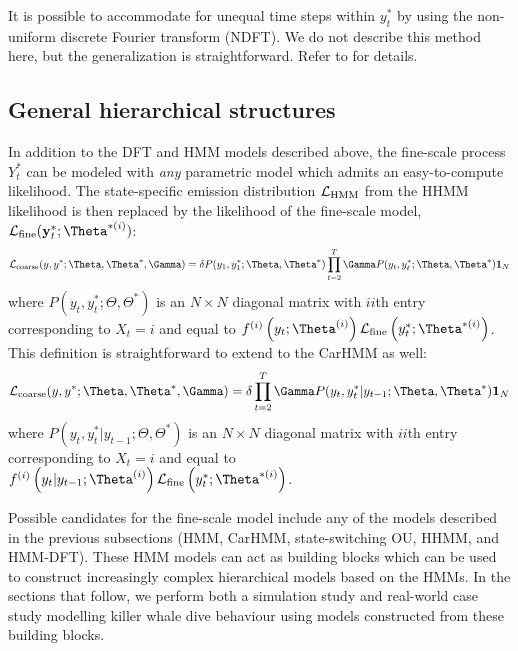 It is possible to accommodate for unequal time steps within $y_t^*$ by using the non-uniform discrete Fourier transform (NDFT). We do not describe this method here, but the generalization is straightforward. Refer to \citep{Bagchi:1999} for details.

\subsection{General hierarchical structures}

In addition to the DFT and HMM models described above, the fine-scale process $Y^*_t$ can be modeled with \textit{any} parametric model which admits an easy-to-compute likelihood. The state-specific emission distribution $\mathcal{L}_{\text{HMM}}$ from the HHMM likelihood is then replaced by the likelihood of the fine-scale model, $\calL_{\text{fine}}(\mathbf{y}^*_t;\Theta^{*(i)})$:
\[
\calL_{\text{coarse}}(y,y^*;\Theta,\Theta^*,\Gamma) = \delta P(y_1,y^*_1;\Theta,\Theta^*) \prod_{t=2}^T \Gamma P(y_t,y^*_t;\Theta,\Theta^*) \mathbf{1}_N
\]
where $P(y_t,y^*_t;\Theta,\Theta^*) $ is an $N \times N$ diagonal matrix with $ii$th entry corresponding to $X_t=i$ and equal to $f^{(i)}\left(y_t;\Theta^{(i)}\right)\calL_{\text{fine}}\left(y^*_t;\Theta^{*(i)}\right)$. This definition is straightforward to extend to the CarHMM as well:
\[
\calL_{\text{coarse}}(y,y^*;\Theta,\Theta^*,\Gamma) = \delta \prod_{t=2}^T \Gamma P(y_t,y^*_t|y_{t-1};\Theta,\Theta^*) \mathbf{1}_N
\]
where $P(y_t,y^*_t|y_{t-1};\Theta,\Theta^*) $ is an $N \times N$ diagonal matrix with $ii$th entry corresponding to $X_t=i$ and equal to $f^{(i)}\left(y_t|y_{t-1};\Theta^{(i)}\right)\calL_{\text{fine}}\left(y^*_t;\Theta^{*(i)}\right)$.

Possible candidates for the fine-scale model include any of the models described in the previous subsections (HMM, CarHMM, state-switching OU, HHMM, and HMM-DFT). These HMM models can act as building blocks which can be used to construct increasingly complex hierarchical models based on the HMMs. In the sections that follow, we perform both a simulation study and real-world case study modelling killer whale dive behaviour using models constructed from these building blocks.